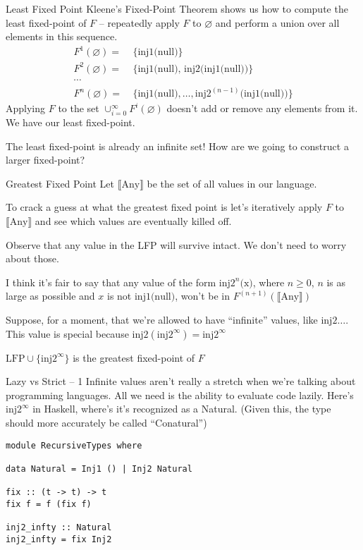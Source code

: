 \documentclass[hyperref={colorlinks = true, urlcolor = blue},pdf]{beamer}
\newcommand{\Semantic}[1]{\llbracket {#1} \rrbracket}
\begin{document}
\begin{frame}{Least Fixed Point}
  Kleene's Fixed-Point Theorem shows us how to compute the least fixed-point of
  $F$ -- repeatedly apply $F$ to $\varnothing$ and perform a union over all
  elements in this sequence.
  \begin{align*}
    F^1(\varnothing) =\ & \{ \text{inj1(null)} \} \\
    F^2(\varnothing) =\ & \{ \text{inj1(null), inj2(inj1(null))} \} \\
    \cdots & \\
    F^n(\varnothing) =\ &
    \{ \text{inj1(null)}, \ldots, {\text{inj2}}^{(n-1)}\text{(inj1(null))} \}
  \end{align*}
  Applying $F$ to the set $\cup_{i=0}^\infty F^i(\varnothing)$ doesn't add or
  remove any elements from it. We have our least fixed-point.
  \medskip

  The least fixed-point is already an infinite set! How are we going to
  construct a larger fixed-point?
\end{frame}
\begin{frame}{Greatest Fixed Point}
  Let $\Semantic{\text{Any}}$ be the set of all values in our language.
  \medskip
  
  To crack a guess at what the greatest fixed point is let's iteratively apply
  $F$ to $\Semantic{\text{Any}}$ and see which values are eventually killed off.
  \medskip

  Observe that any value in the LFP will survive intact. We don't need to worry
  about those.
  \medskip

  I think it's fair to say that any value of the form
  ${\text{inj2}}^n\text{(x)}$, where $n \geq 0$, $n$ is as large as possible and
  $x$ is not $\text{inj1(null)}$, won't be in $F^{(n+1)}(\Semantic{\text{Any}})$
  \medskip

  Suppose, for a moment, that  we're allowed to have ``infinite'' values, like
  ${\text{inj2}}\ldots$. This value is special because
  $\text{inj2}({\text{inj2}}^\infty) = {\text{inj2}}^\infty$
  \medskip

  $\text{LFP} \cup \{{\text{inj2}}^\infty\}$ is the greatest fixed-point of $F$
\end{frame}
\begin{frame}[fragile]{Lazy vs Strict -- 1}
  Infinite values aren't really a stretch when we're talking about programming
  languages. All we need is the ability to evaluate code lazily. Here's
  ${\text{inj2}}^\infty$ in Haskell, where's it's recognized as a Natural.
  (Given this, the type should more accurately be called ``Conatural'')
\begin{verbatim}
module RecursiveTypes where

data Natural = Inj1 () | Inj2 Natural 

fix :: (t -> t) -> t
fix f = f (fix f)

inj2_infty :: Natural
inj2_infty = fix Inj2
\end{verbatim}
\end{frame}
\end{document}

